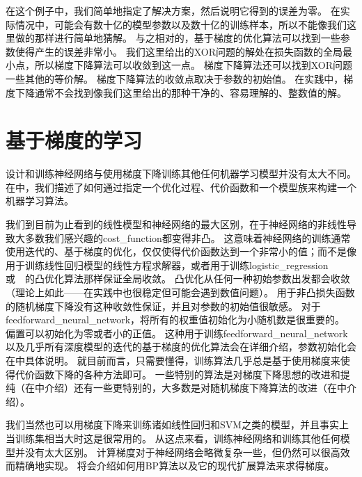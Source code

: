 在这个例子中，我们简单地指定了解决方案，然后说明它得到的误差为零。
在实际情况中，可能会有数十亿的模型参数以及数十亿的训练样本，所以不能像我们这里做的那样进行简单地猜解。
与之相对的，基于梯度的优化算法可以找到一些参数使得产生的误差非常小。
我们这里给出的XOR问题的解处在损失函数的全局最小点，所以梯度下降算法可以收敛到这一点。
梯度下降算法还可以找到XOR问题一些其他的等价解。
梯度下降算法的收敛点取决于参数的初始值。
在实践中，梯度下降通常不会找到像我们这里给出的那种干净的、容易理解的、整数值的解。

\section{基于梯度的学习}
\label{sec:gradient_based_learning}

设计和训练神经网络与使用梯度下降训练其他任何机器学习模型并没有太大不同。
在中，我们描述了如何通过指定一个优化过程、代价函数和一个模型族来构建一个机器学习算法。

我们到目前为止看到的线性模型和神经网络的最大区别，在于神经网络的非线性导致大多数我们感兴趣的\gls{cost_function}都变得非凸。
这意味着神经网络的训练通常使用迭代的、基于梯度的优化，仅仅使得代价函数达到一个非常小的值；而不是像用于训练线性回归模型的线性方程求解器，或者用于训练\gls{logistic_regression}或~~的凸优化算法那样保证全局收敛。
凸优化从任何一种初始参数出发都会收敛（理论上如此——在实践中也很稳定但可能会遇到数值问题）。
用于非凸损失函数的随机梯度下降没有这种收敛性保证，并且对参数的初始值很敏感。
对于\gls{feedforward_neural_network}，将所有的权重值初始化为小随机数是很重要的。
偏置可以初始化为零或者小的正值。
这种用于训练\gls{feedforward_neural_network}以及几乎所有深度模型的迭代的基于梯度的优化算法会在详细介绍，参数初始化会在中具体说明。
就目前而言，只需要懂得，训练算法几乎总是基于使用梯度来使得代价函数下降的各种方法即可。
一些特别的算法是对梯度下降思想的改进和提纯（在中介绍）还有一些更特别的，大多数是对随机梯度下降算法的改进（在中介绍）。


我们当然也可以用梯度下降来训练诸如线性回归和\gls{SVM}之类的模型，并且事实上当训练集相当大时这是很常用的。
从这点来看，训练神经网络和训练其他任何模型并没有太大区别。
计算梯度对于神经网络会略微复杂一些，但仍然可以很高效而精确地实现。
将会介绍如何用\gls{BP}算法以及它的现代扩展算法来求得梯度。

